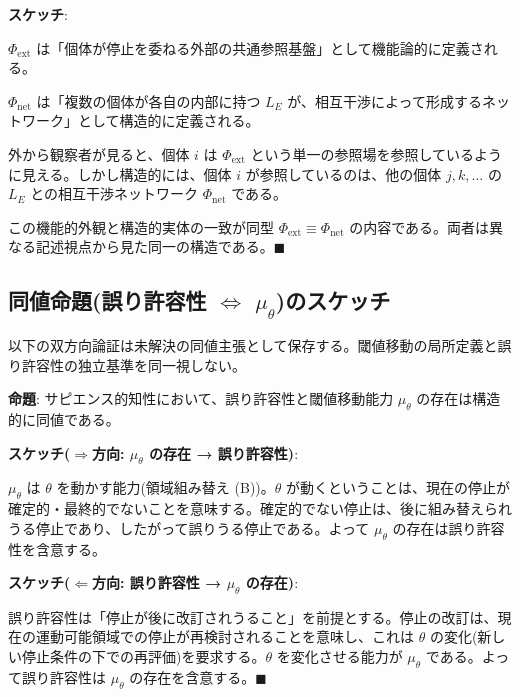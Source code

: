 \textbf{スケッチ}:

$\Phi_{\text{ext}}$ は「個体が停止を委ねる外部の共通参照基盤」として機能論的に定義される。

$\Phi_{\text{net}}$ は「複数の個体が各自の内部に持つ $L_E$ が、相互干渉によって形成するネットワーク」として構造的に定義される。

外から観察者が見ると、個体 $i$ は $\Phi_{\text{ext}}$ という単一の参照場を参照しているように見える。しかし構造的には、個体 $i$ が参照しているのは、他の個体 $j, k, \ldots$ の $L_E$ との相互干渉ネットワーク $\Phi_{\text{net}}$ である。

この機能的外観と構造的実体の一致が同型 $\Phi_{\text{ext}} \equiv \Phi_{\text{net}}$ の内容である。両者は異なる記述視点から見た同一の構造である。$\blacksquare$

\bigskip


\subsection{同値命題(誤り許容性 $\Leftrightarrow$ $\mu_\theta$)のスケッチ}

以下の双方向論証は未解決の同値主張として保存する。閾値移動の局所定義と誤り許容性の独立基準を同一視しない。


\textbf{命題}: サピエンス的知性において、誤り許容性と閾値移動能力 $\mu_\theta$ の存在は構造的に同値である。

\textbf{スケッチ($\Rightarrow$方向: $\mu_\theta$ の存在 → 誤り許容性)}:

$\mu_\theta$ は $\theta$ を動かす能力(領域組み替え (B))。$\theta$ が動くということは、現在の停止が確定的・最終的でないことを意味する。確定的でない停止は、後に組み替えられうる停止であり、したがって誤りうる停止である。よって $\mu_\theta$ の存在は誤り許容性を含意する。

\textbf{スケッチ($\Leftarrow$方向: 誤り許容性 → $\mu_\theta$ の存在)}:

誤り許容性は「停止が後に改訂されうること」を前提とする。停止の改訂は、現在の運動可能領域での停止が再検討されることを意味し、これは $\theta$ の変化(新しい停止条件の下での再評価)を要求する。$\theta$ を変化させる能力が $\mu_\theta$ である。よって誤り許容性は $\mu_\theta$ の存在を含意する。$\blacksquare$

\bigskip
